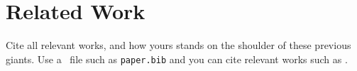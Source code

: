 \section{Related Work}
\label{sec:related}

Cite all relevant works, and how yours stands on the shoulder of these previous giants.
Use a \BibTeX\ file such as \texttt{paper.bib} and you can cite relevant works such as \cite{Abril07}.